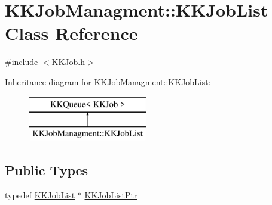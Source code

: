 \hypertarget{class_k_k_job_managment_1_1_k_k_job_list}{}\section{K\+K\+Job\+Managment\+:\+:K\+K\+Job\+List Class Reference}
\label{class_k_k_job_managment_1_1_k_k_job_list}


{\ttfamily \#include $<$K\+K\+Job.\+h$>$}

Inheritance diagram for K\+K\+Job\+Managment\+:\+:K\+K\+Job\+List\+:\begin{figure}[H]
\begin{center}
\leavevmode
\includegraphics[height=2.000000cm]{class_k_k_job_managment_1_1_k_k_job_list}
\end{center}
\end{figure}
\subsection*{Public Types}
\begin{DoxyCompactItemize}
\item 
typedef \hyperlink{class_k_k_job_managment_1_1_k_k_job_list}{K\+K\+Job\+List} $\ast$ \hyperlink{class_k_k_job_managment_1_1_k_k_job_list_ae9328a2a44a4bdb64ed24898ceb181c6}{K\+K\+Job\+List\+Ptr}
\end{DoxyCompactItemize}

